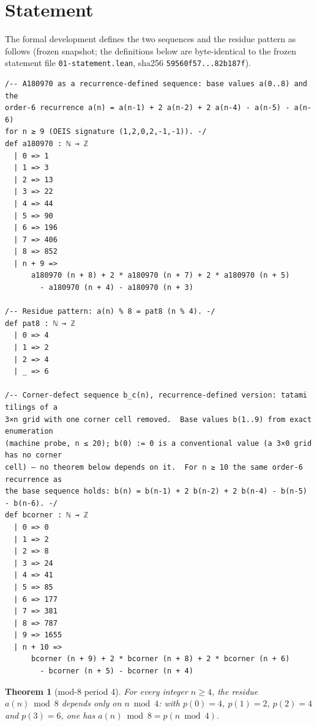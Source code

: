 \documentclass[11pt]{article}
\newtheorem{theorem}{Theorem}
\begin{document}
\section{Statement}

The formal development defines the two sequences and the residue pattern
 as follows (frozen snapshot; the definitions below are
byte-identical to the frozen statement file \texttt{01-statement.lean},
sha256 \texttt{59560f57...82b187f}).

\begin{lstlisting}[caption={Formal definitions of \texttt{a180970}, \texttt{pat8} and \texttt{bcorner} (verbatim excerpt, lines 12--54 of \texttt{final/01-proof-complete.lean}; byte-identical to the frozen statement file).},label={lst:defs}]
/-- A180970 as a recurrence-defined sequence: base values a(0..8) and the
order-6 recurrence a(n) = a(n-1) + 2 a(n-2) + 2 a(n-4) - a(n-5) - a(n-6)
for n ≥ 9 (OEIS signature (1,2,0,2,-1,-1)). -/
def a180970 : ℕ → ℤ
  | 0 => 1
  | 1 => 3
  | 2 => 13
  | 3 => 22
  | 4 => 44
  | 5 => 90
  | 6 => 196
  | 7 => 406
  | 8 => 852
  | n + 9 =>
      a180970 (n + 8) + 2 * a180970 (n + 7) + 2 * a180970 (n + 5)
        - a180970 (n + 4) - a180970 (n + 3)

/-- Residue pattern: a(n) % 8 = pat8 (n % 4). -/
def pat8 : ℕ → ℤ
  | 0 => 4
  | 1 => 2
  | 2 => 4
  | _ => 6

/-- Corner-defect sequence b_c(n), recurrence-defined version: tatami tilings of a
3×n grid with one corner cell removed.  Base values b(1..9) from exact enumeration
(machine probe, n ≤ 20); b(0) := 0 is a conventional value (a 3×0 grid has no corner
cell) — no theorem below depends on it.  For n ≥ 10 the same order-6 recurrence as
the base sequence holds: b(n) = b(n-1) + 2 b(n-2) + 2 b(n-4) - b(n-5) - b(n-6). -/
def bcorner : ℕ → ℤ
  | 0 => 0
  | 1 => 2
  | 2 => 8
  | 3 => 24
  | 4 => 41
  | 5 => 85
  | 6 => 177
  | 7 => 381
  | 8 => 787
  | 9 => 1655
  | n + 10 =>
      bcorner (n + 9) + 2 * bcorner (n + 8) + 2 * bcorner (n + 6)
        - bcorner (n + 5) - bcorner (n + 4)
\end{lstlisting}

\begin{theorem}[mod-8 period 4]\label{thm:p1}
For every integer $n \geq 4$, the residue $a(n) \bmod 8$ depends only on
$n \bmod 4$: with $p(0) = 4$, $p(1) = 2$, $p(2) = 4$ and $p(3) = 6$, one has
$a(n) \bmod 8 = p(n \bmod 4)$.
\end{theorem}
\end{document}
